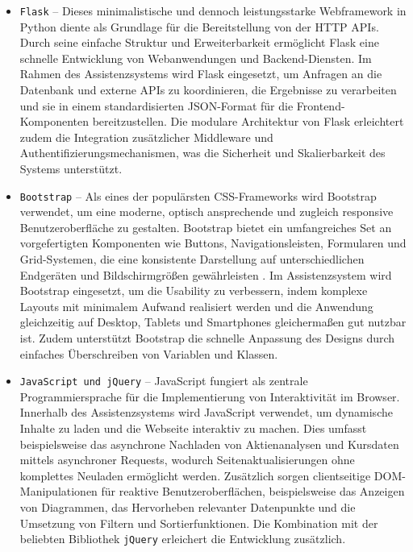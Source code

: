       \begin{itemize}
          \item \texttt{Flask} – Dieses minimalistische und dennoch leistungsstarke Webframework in Python diente als Grundlage für die Bereitstellung von der HTTP APIs.
          Durch seine einfache Struktur und Erweiterbarkeit ermöglicht Flask eine schnelle Entwicklung von Webanwendungen und Backend-Diensten.
          Im Rahmen des Assistenzsystems wird Flask eingesetzt, um Anfragen an die Datenbank und externe APIs zu koordinieren, die Ergebnisse zu verarbeiten und sie in einem standardisierten \acs{JSON}-Format für die Frontend-Komponenten bereitzustellen.
          Die modulare Architektur von Flask erleichtert zudem die Integration zusätzlicher Middleware und Authentifizierungsmechanismen, was die Sicherheit und Skalierbarkeit des Systems unterstützt.

          \item \texttt{Bootstrap} – Als eines der populärsten CSS-Frameworks wird Bootstrap verwendet, um eine moderne, optisch ansprechende und zugleich responsive Benutzeroberfläche zu gestalten.
          Bootstrap bietet ein umfangreiches Set an vorgefertigten Komponenten wie Buttons, Navigationsleisten, Formularen und Grid-Systemen, die eine konsistente Darstellung auf unterschiedlichen Endgeräten und Bildschirmgrößen gewährleisten \autocite{bootstrap_front_end_framework_2025}.
          Im Assistenzsystem wird Bootstrap eingesetzt, um die Usability zu verbessern, indem komplexe Layouts mit minimalem Aufwand realisiert werden und die Anwendung gleichzeitig auf Desktop, Tablets und Smartphones gleichermaßen gut nutzbar ist.
          Zudem unterstützt Bootstrap die schnelle Anpassung des Designs durch einfaches Überschreiben von Variablen und Klassen.

          \item \texttt{JavaScript und jQuery} – JavaScript fungiert als zentrale Programmiersprache für die Implementierung von Interaktivität im Browser.
          Innerhalb des Assistenzsystems wird JavaScript verwendet, um dynamische Inhalte zu laden und die Webseite interaktiv zu machen.
          Dies umfasst beispielsweise das asynchrone Nachladen von Aktienanalysen und Kursdaten mittels asynchroner Requests, wodurch Seitenaktualisierungen ohne komplettes Neuladen ermöglicht werden.
          Zusätzlich sorgen clientseitige DOM-Manipulationen für reaktive Benutzeroberflächen, beispielsweise das Anzeigen von Diagrammen, das Hervorheben relevanter Datenpunkte und die Umsetzung von Filtern und Sortierfunktionen.
          Die Kombination mit der beliebten Bibliothek \texttt{jQuery} erleichert die Entwicklung zusätzlich.


\end{itemize}
